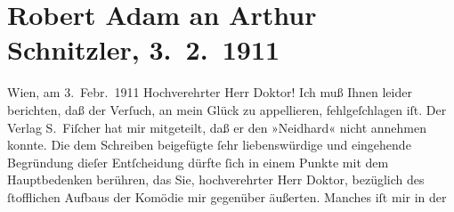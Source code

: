 

         
         \renewcommand{\erwaehntePersonen}{Personen: Robert Adam, Julius Bittner}
         \renewcommand{\erwaehnteInstitutionen}{Institutionen: Der Merker, S. Fischer Verlag}
         \renewcommand{\erwaehnteOrte}{Orte: Wien}
         \renewcommand{\erwaehnteWerke}{Werke: Die Geschichte des Alî ibn Bekkâr mit Schams an-Nahâr, Neidhard}
               \section[Robert Adam an Arthur Schnitzler, 3. 2. 1911]{ Robert Adam an Arthur Schnitzler, 3. 2. 1911}\nopagebreak{}\rehead{ }\begin{ledgroupsized}[t]{13cm}\normalsize\beginnumbering \toendnotes[C]{\smallbreak\pagebreak[2]} 
\toendnotes[C]{\smallbreak}\pstart
           \raggedleft{}{\pb}Wien, am 3. Febr. 1911\pend
           \pstart{}Hochverehrter Herr Doktor!\pend\pstart
           Ich muß Ihnen leider berichten, daß der Verſuch, an mein Glück zu appellieren,
               fehlgeſchlagen iſt. Der Verlag S. Fiſcher hat mir
               mitgeteilt, daß er den »Neidhard« nicht annehmen
               konnte. Die dem Schreiben beigefügte ſehr liebenswürdige und eingehende Begründung
               dieſer Entſcheidung dürfte ſich in einem Punkte mit dem Hauptbedenken berühren, das
               Sie, hochverehrter Herr Doktor, {\pb}bezüglich des
               ſtofflichen Aufbaus der Komödie mir gegenüber äußerten. Manches iſt mir in der

\end{ledgroupsized}
